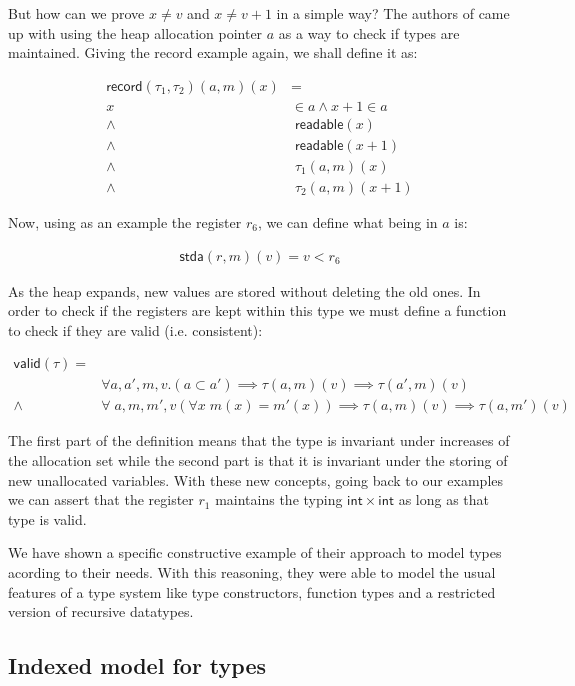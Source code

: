 \documentclass{article}
\begin{document}
But how can we prove $x\neq v$ and $x\neq v+1$ in a
simple way? The authors of \cite{appel:fpcc:semantic} 
came up with using the heap allocation pointer $a$ as 
a way to check if types are maintained. Giving the 
record example again, we shall define it as:

\begin{align*}
  \mathsf{record}(\tau_1,\tau_2)(a,m)(x)&=\\
  x&\in a\wedge x+1\in a\\
  \wedge&\;\mathsf{readable}(x) \\
  \wedge&\;\mathsf{readable}(x+1)\\
  \wedge&\;\tau_1(a, m)(x)\\
  \wedge&\;\tau_2(a, m)(x+1)
\end{align*}

Now, using as an example the register $r_6$, we can 
define what being in $a$ is:

\begin{align*}
    \mathsf{stda}(r,m)(v)=v<r_6
\end{align*}

As the heap expands, new values are stored without 
deleting the old ones. In order to check if the 
registers are kept within this type we must define 
a function to check if they are valid (i.e. 
consistent):

\begin{align*}
  \mathsf{valid}(\tau)=&\\
  &\forall a,a',m,v. (a \subset a') \implies 
    \tau(a,m)(v) \implies \tau(a',m)(v)\\
  \wedge&\forall\;a,m,m',v (\forall x\;m(x)=m'(x))
    \implies \tau(a,m)(v) \implies \tau(a,m')(v)
\end{align*}

The first part of the definition means that the type 
is invariant under increases of the allocation set
while the second part is that it is invariant under 
the storing of new unallocated variables. With these
new concepts, going back to our examples we can
assert that the register $r_1$ maintains the typing 
$\mathsf{int}\times\mathsf{int}$ as long as that 
type is valid. 

We have shown a specific constructive example of their 
approach to model types acording to their needs. With 
this reasoning, they were able to model the usual 
features of a type system like type constructors, 
function types and a restricted version of recursive 
datatypes.

\subsection*{Indexed model for types}
\end{document}
